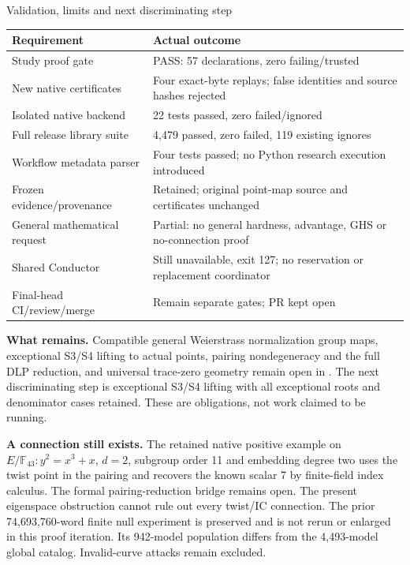 \documentclass[10pt]{article}
\begin{document}
\newpage
\begin{center}{\Large Validation, limits and next discriminating step}\end{center}
\begin{tabular}{p{.39\linewidth}p{.56\linewidth}}
\toprule
Requirement & Actual outcome\\\midrule
Study proof gate & PASS: 57 declarations, zero failing/trusted\\
New native certificates & Four exact-byte replays; false identities and source hashes rejected\\
Isolated native backend & 22 tests passed, zero failed/ignored\\
Full release library suite & 4,479 passed, zero failed, 119 existing ignores\\
Workflow metadata parser & Four tests passed; no Python research execution introduced\\
Frozen evidence/provenance & Retained; original point-map source and certificates unchanged\\
General mathematical request & Partial: no general hardness, advantage, GHS or no-connection proof\\
Shared Conductor & Still unavailable, exit 127; no reservation or replacement coordinator\\
Final-head CI/review/merge & Remain separate gates; PR kept open\\\bottomrule
\end{tabular}

\textbf{What remains.} Compatible general Weierstrass normalization group maps,
exceptional S3/S4 lifting to actual points, pairing nondegeneracy and the full
DLP reduction, and universal trace-zero geometry remain open in
. The next discriminating
step is exceptional S3/S4 lifting with all exceptional roots and denominator
cases retained. These are obligations, not work claimed to be running.

\textbf{A connection still exists.} The retained native positive example on
$E/\mathbb F_{43}:y^2=x^3+x$, $d=2$, subgroup order 11 and embedding degree two
uses the twist point in the pairing and recovers the known scalar 7 by finite-field
index calculus. The formal pairing-reduction bridge remains open. The present
eigenspace obstruction cannot rule out every twist/IC connection. The prior
74,693,760-word finite null experiment is preserved and is not rerun or enlarged
in this proof iteration. Its 942-model population differs from the 4,493-model
global catalog. Invalid-curve attacks remain excluded.
\end{document}
